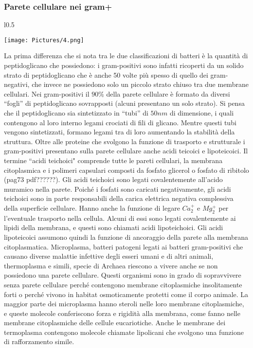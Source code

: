 \subsubsection{Parete cellulare nei gram+} 
\begin{wrapfigure}{l}{0.5\textwidth}
  \begin{center}
    \texttt{[image: Pictures/4.png]}
  \end{center}
\end{wrapfigure}
La prima differenza che si nota tra le due classificazioni di batteri è la quantità di peptidoglicano che possiedono: i gram-positivi sono infatti ricoperti da un 
solido strato di peptidoglicano che è anche 50 volte più spesso di quello dei gram-negativi, che invece ne possiedono solo un piccolo strato chiuso tra due membrane cellulari.
Nei gram-positivi il $90\%$ della parete cellulare \`e formato da diversi ``fogli” di peptidoglicano sovrapposti (alcuni presentano un solo strato). 
Si pensa che il peptidoglicano sia sintetizzato in ``tubi” di $50nm$ di dimensione, i quali contengono al 
loro interno legami crociati di fili di glicano. Mentre questi tubi vengono sintetizzati, formano legami tra di loro aumentando la stabilit\`a della struttura. 
Oltre alle proteine che svolgono la funzione di trasporto e strutturale i gram-positivi presentano sulla parete cellulare anche acidi teicoici e lipoteicoici. Il 
termine ``acidi teichoici" comprende tutte le pareti cellulari, la membrana citoplasmica e i polimeri capsulari composti da fosfato glicerol o fosfato di 
ribitolo (pag73 pdf??????). Gli acidi teichoici sono legati covalentemente all’acido muramico nella parete. Poiché i fosfati sono caricati negativamente, gli acidi 
teichoici sono in parte responsabili della carica elettrica negativa complessiva della superficie cellulare. Hanno anche la funzione di legare 
$Ca_2^+$ e $Mg_2^+$ per l'eventuale trasporto nella cellula. Alcuni di essi sono legati covalentemente ai lipidi della membrana, e questi sono chiamati 
acidi lipoteichoici. Gli acidi lipoteicoici assumono quindi la funzione di ancoraggio della parete alla membrana citoplasmatica. Microplasma, 
batteri patogeni legati ai batteri gram-positivi che causano diverse malattie infettive degli esseri umani e di altri animali, thermoplasma e simili, 
specie di Archaea riescono a vivere anche se non possiedono una parete cellulare. Questi organismi sono in grado di sopravvivere senza parete cellulare perché contengono 
membrane citoplasmiche insolitamente forti o perché vivono in habitat osmoticamente protetti come il corpo animale. La maggior parte dei microplasma hanno 
steroli nelle loro membrane citoplasmiche, e queste molecole conferiscono forza e rigidità alla membrana, come fanno nelle membrane citoplasmiche delle 
cellule eucariotiche. Anche le membrane dei termoplasma contengono molecole chiamate lipolicani che svolgono una funzione di rafforzamento simile.
